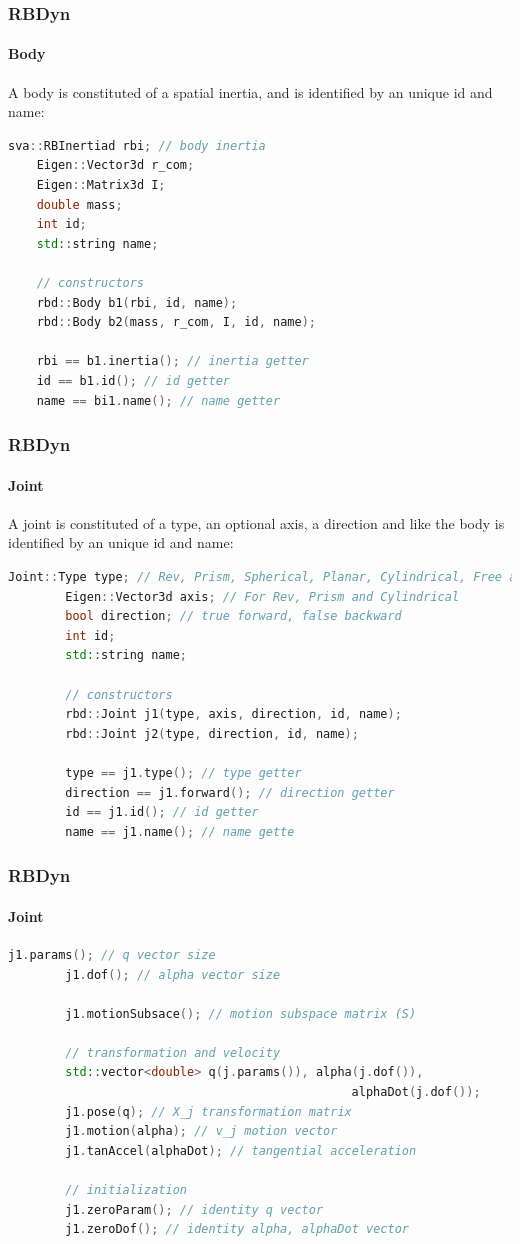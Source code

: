 \documentclass{beamer}
\begin{document}
\begin{frame}[fragile]
\frametitle{RBDyn}
\framesubtitle{Body}
A body is constituted of a spatial inertia, and is identified by an unique id and name:
\begin{lstlisting}[language=C++]
	sva::RBInertiad rbi; // body inertia
	Eigen::Vector3d r_com;
	Eigen::Matrix3d I;
	double mass;
	int id;
	std::string name;

	// constructors
	rbd::Body b1(rbi, id, name);
	rbd::Body b2(mass, r_com, I, id, name);

	rbi == b1.inertia(); // inertia getter
	id == b1.id(); // id getter
	name == bi1.name(); // name getter
\end{lstlisting}
\end{frame}

	\begin{frame}[fragile]
	\frametitle{RBDyn}
	\framesubtitle{Joint}
	A joint is constituted of a type, an optional axis, a direction and like the body is identified by an
	unique id and name:
	\begin{lstlisting}[language=C++]
		Joint::Type type; // Rev, Prism, Spherical, Planar, Cylindrical, Free and Fixed
		Eigen::Vector3d axis; // For Rev, Prism and Cylindrical
		bool direction; // true forward, false backward
		int id;
		std::string name;

		// constructors
		rbd::Joint j1(type, axis, direction, id, name);
		rbd::Joint j2(type, direction, id, name);

		type == j1.type(); // type getter
		direction == j1.forward(); // direction getter
		id == j1.id(); // id getter
		name == j1.name(); // name gette
	\end{lstlisting}
\end{frame}
	\begin{frame}[fragile]
	\frametitle{RBDyn}
	\framesubtitle{Joint}
	\begin{lstlisting}[language=C++]
		j1.params(); // q vector size
		j1.dof(); // alpha vector size

		j1.motionSubsace(); // motion subspace matrix (S)

		// transformation and velocity
		std::vector<double> q(j.params()), alpha(j.dof()),
												alphaDot(j.dof());
		j1.pose(q); // X_j transformation matrix
		j1.motion(alpha); // v_j motion vector
		j1.tanAccel(alphaDot); // tangential acceleration

		// initialization
		j1.zeroParam(); // identity q vector
		j1.zeroDof(); // identity alpha, alphaDot vector
	\end{lstlisting}
\end{frame}
\end{document}
